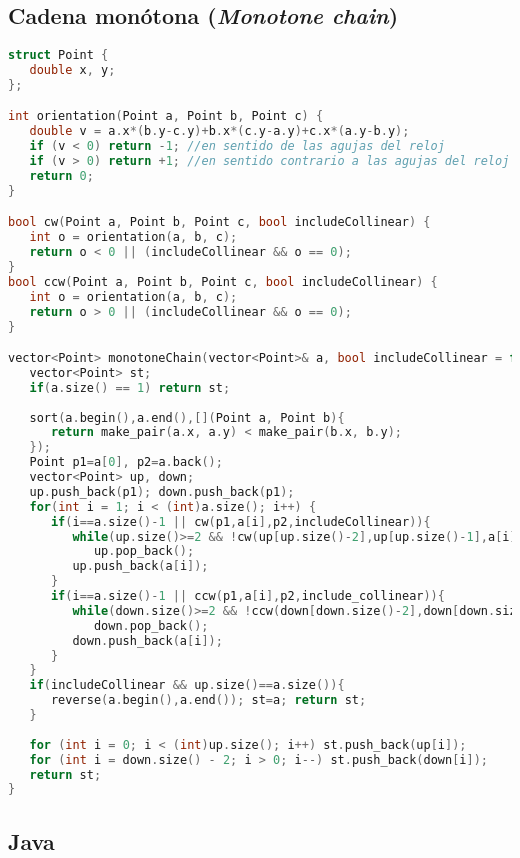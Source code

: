 \subsection{Cadena monótona (\emph{Monotone chain})}
\begin{lstlisting}[language=C++]
struct Point {
   double x, y;
};

int orientation(Point a, Point b, Point c) {
   double v = a.x*(b.y-c.y)+b.x*(c.y-a.y)+c.x*(a.y-b.y);
   if (v < 0) return -1; //en sentido de las agujas del reloj
   if (v > 0) return +1; //en sentido contrario a las agujas del reloj
   return 0;
}

bool cw(Point a, Point b, Point c, bool includeCollinear) {
   int o = orientation(a, b, c);
   return o < 0 || (includeCollinear && o == 0);
}
bool ccw(Point a, Point b, Point c, bool includeCollinear) {
   int o = orientation(a, b, c);
   return o > 0 || (includeCollinear && o == 0);
}

vector<Point> monotoneChain(vector<Point>& a, bool includeCollinear = false) {
   vector<Point> st;
   if(a.size() == 1) return st;
   
   sort(a.begin(),a.end(),[](Point a, Point b){
      return make_pair(a.x, a.y) < make_pair(b.x, b.y);
   });
   Point p1=a[0], p2=a.back();
   vector<Point> up, down;
   up.push_back(p1); down.push_back(p1);
   for(int i = 1; i < (int)a.size(); i++) {
      if(i==a.size()-1 || cw(p1,a[i],p2,includeCollinear)){
         while(up.size()>=2 && !cw(up[up.size()-2],up[up.size()-1],a[i],includeCollinear))
            up.pop_back();
         up.push_back(a[i]);
      }
      if(i==a.size()-1 || ccw(p1,a[i],p2,include_collinear)){
         while(down.size()>=2 && !ccw(down[down.size()-2],down[down.size()-1],a[i],includeCollinear))
            down.pop_back();
         down.push_back(a[i]);
      }
   }
   if(includeCollinear && up.size()==a.size()){
      reverse(a.begin(),a.end()); st=a; return st;
   }
   
   for (int i = 0; i < (int)up.size(); i++) st.push_back(up[i]);
   for (int i = down.size() - 2; i > 0; i--) st.push_back(down[i]);
   return st;
}
\end{lstlisting}


\subsection{Java}

